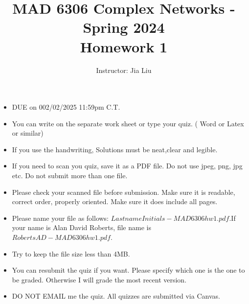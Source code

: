 \documentclass{amsart}
\theoremstyle{definition}
\theoremstyle{remark}
\numberwithin{equation}{section}
\begin{document}
\title{MAD 6306 Complex Networks  - Spring 2024\\{\bf Homework 1}}%
\author{Instructor: Jia Liu}%
\date{}


\maketitle
\begin{itemize}
\item DUE on 002/02/2025 11:59pm C.T.
\item You can write on the separate work sheet or type your quiz. ( Word or Latex or similar)
\item If you use the handwriting, Solutions must be neat,clear and legible.
\item If you need to scan you quiz, save it as a PDF file. Do not use jpeg, png, jpg etc. Do not submit more than one file.
\item Please check your scanned file before submission. Make sure it is readable, correct order, properly oriented. Make sure it does include all pages.
\item Please name your file as follows: $LastnameInitials-MAD6306hw1.pdf$.If your name is Alan David Roberts, file name is $RobertsAD-MAD6306hw1.pdf$.
\item Try to keep the file size less than 4MB.
\item You can resubmit the quiz if you want. Please specify which one is the one to be graded. Otherwise I will grade the most recent version.
\item DO NOT EMAIL me the quiz. All quizzes are submitted via Canvas.
\end{itemize}
\end{document}
